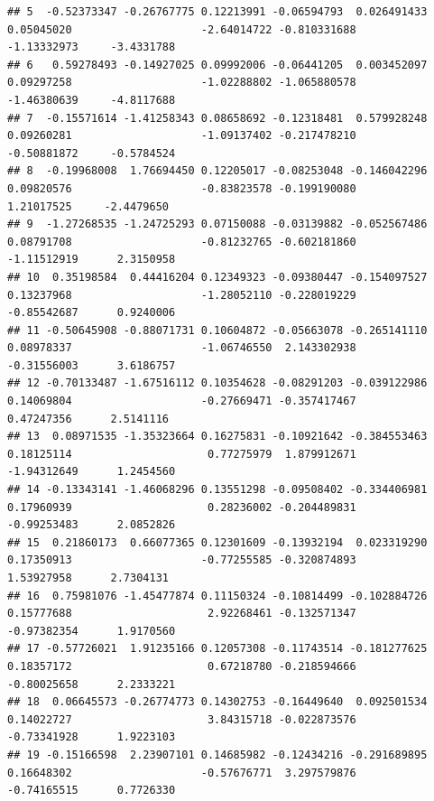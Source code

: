 \documentclass[
]{article}
\begin{document}
\begin{verbatim}
## 5  -0.52373347 -0.26767775 0.12213991 -0.06594793  0.026491433  0.05045020                    -2.64014722 -0.810331688                             -1.13332973     -3.4331788
## 6   0.59278493 -0.14927025 0.09992006 -0.06441205  0.003452097  0.09297258                    -1.02288802 -1.065880578                             -1.46380639     -4.8117688
## 7  -0.15571614 -1.41258343 0.08658692 -0.12318481  0.579928248  0.09260281                    -1.09137402 -0.217478210                             -0.50881872     -0.5784524
## 8  -0.19968008  1.76694450 0.12205017 -0.08253048 -0.146042296  0.09820576                    -0.83823578 -0.199190080                              1.21017525     -2.4479650
## 9  -1.27268535 -1.24725293 0.07150088 -0.03139882 -0.052567486  0.08791708                    -0.81232765 -0.602181860                             -1.11512919      2.3150958
## 10  0.35198584  0.44416204 0.12349323 -0.09380447 -0.154097527  0.13237968                    -1.28052110 -0.228019229                             -0.85542687      0.9240006
## 11 -0.50645908 -0.88071731 0.10604872 -0.05663078 -0.265141110  0.08978337                    -1.06746550  2.143302938                             -0.31556003      3.6186757
## 12 -0.70133487 -1.67516112 0.10354628 -0.08291203 -0.039122986  0.14069804                    -0.27669471 -0.357417467                              0.47247356      2.5141116
## 13  0.08971535 -1.35323664 0.16275831 -0.10921642 -0.384553463  0.18125114                     0.77275979  1.879912671                             -1.94312649      1.2454560
## 14 -0.13343141 -1.46068296 0.13551298 -0.09508402 -0.334406981  0.17960939                     0.28236002 -0.204489831                             -0.99253483      2.0852826
## 15  0.21860173  0.66077365 0.12301609 -0.13932194  0.023319290  0.17350913                    -0.77255585 -0.320874893                              1.53927958      2.7304131
## 16  0.75981076 -1.45477874 0.11150324 -0.10814499 -0.102884726  0.15777688                     2.92268461 -0.132571347                             -0.97382354      1.9170560
## 17 -0.57726021  1.91235166 0.12057308 -0.11743514 -0.181277625  0.18357172                     0.67218780 -0.218594666                             -0.80025658      2.2333221
## 18  0.06645573 -0.26774773 0.14302753 -0.16449640  0.092501534  0.14022727                     3.84315718 -0.022873576                             -0.73341928      1.9223103
## 19 -0.15166598  2.23907101 0.14685982 -0.12434216 -0.291689895  0.16648302                    -0.57676771  3.297579876                             -0.74165515      0.7726330

\end{verbatim}
\end{document}
